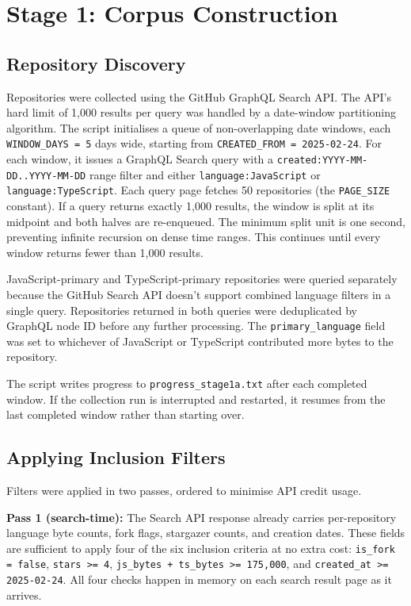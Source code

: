 \section{Stage 1: Corpus Construction}
\label{sec:impl:corpus}

\subsection{Repository Discovery}

Repositories were collected using the GitHub GraphQL Search API. The API's hard limit of 1,000 results per query was handled by a date-window partitioning algorithm. The script initialises a queue of non-overlapping date windows, each \texttt{WINDOW\_DAYS = 5} days wide, starting from \texttt{CREATED\_FROM = 2025-02-24}. For each window, it issues a GraphQL Search query with a \texttt{created:YYYY-MM-DD..YYYY-MM-DD} range filter and either \texttt{language:JavaScript} or \texttt{language:TypeScript}. Each query page fetches 50 repositories (the \texttt{PAGE\_SIZE} constant). If a query returns exactly 1,000 results, the window is split at its midpoint and both halves are re-enqueued. The minimum split unit is one second, preventing infinite recursion on dense time ranges. This continues until every window returns fewer than 1,000 results.

JavaScript-primary and TypeScript-primary repositories were queried separately because the GitHub Search API doesn't support combined language filters in a single query. Repositories returned in both queries were deduplicated by GraphQL node ID before any further processing. The \texttt{primary\_language} field was set to whichever of JavaScript or TypeScript contributed more bytes to the repository.

The script writes progress to \texttt{progress\_stage1a.txt} after each completed window. If the collection run is interrupted and restarted, it resumes from the last completed window rather than starting over.

\subsection{Applying Inclusion Filters}

Filters were applied in two passes, ordered to minimise API credit usage.

\textbf{Pass 1 (search-time):} The Search API response already carries per-repository language byte counts, fork flags, stargazer counts, and creation dates. These fields are sufficient to apply four of the six inclusion criteria at no extra cost: \texttt{is\_fork = false}, \texttt{stars >= 4}, \texttt{js\_bytes + ts\_bytes >= 175,000}, and \texttt{created\_at >= 2025-02-24}. All four checks happen in memory on each search result page as it arrives.

